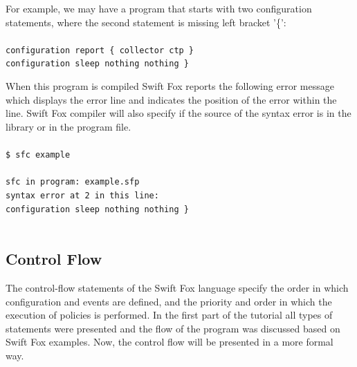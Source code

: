 For example, we may have a program that starts with two configuration
statements, where the second statement is missing left bracket '\{': \\
\\
\texttt{configuration report \{ collector ctp \} \\
configuration sleep  nothing nothing \}\\
}

\noindent When this program is compiled Swift Fox reports the following 
error message which displays the error line and indicates the position
of the error within the line. Swift Fox compiler will also specify if
the source of the syntax error is in the library or in the program file.\\
\\
\texttt{\$ sfc example\\
\\
sfc in program: example.sfp\\
syntax error at 2 in this line:\\
configuration sleep  nothing nothing \}\\
\hspace*{4cm}\^\\
}

\subsection{Control Flow}
\label{sec:control}

The control-flow statements of the Swift Fox language specify the order in 
which configuration and events are defined, and the priority and order in
which the execution of policies is performed. In the first part of the
tutorial all types of statements were presented and the flow of the program
was discussed based on Swift Fox examples. Now, the control flow will be
presented in a more formal way.

